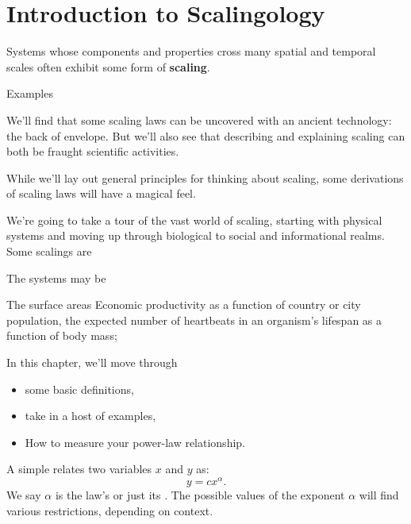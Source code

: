 \section{Introduction to Scalingology}

Systems whose components and properties
cross many spatial and temporal scales
often exhibit some form of \textbf{scaling}.

Examples

We'll find that some scaling laws
can be uncovered with an ancient technology:
the back of envelope.
But we'll also see
that describing and explaining scaling can both be
fraught scientific activities.

While we'll lay out general principles for thinking about scaling,
some derivations of scaling laws will have a magical feel.


We're going to take a tour of the vast world of scaling, 
starting with physical systems 
and moving up through
biological to social and informational realms.
Some scalings are 



The systems may be 


The surface areas 
Economic productivity as a function of country or city population,
the expected number of heartbeats in an organism's lifespan as a
function of body mass;

In this chapter, we'll move through 
\begin{itemize}
\item 
  some basic definitions,
\item 
  take in a host of examples,
\item 
  How to measure your power-law relationship.
\end{itemize}



A simple 
relates two
variables $x$ and $y$ as:
\begin{equation}
y
=
c
x^\alpha.
\label{eq.pocsbook:powerlaw}
\end{equation}
We say $\alpha$ is the law's 
or just its .
The possible values of the exponent $\alpha$
will find various restrictions, depending on context.

